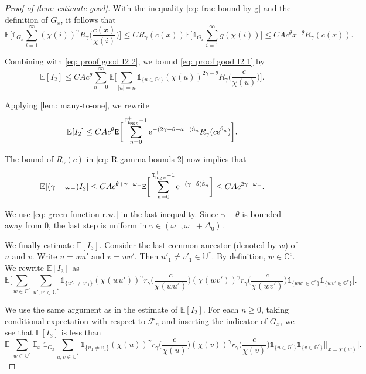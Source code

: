 \documentclass[10pt,a4paper]{amsart}
\begin{document}
\begin{proof}[Proof of \cref{lem: estimate good}]
\noindent With the inequality \eqref{eq: frac bound by g} and the definition of $G_x$, it follows that
\[\mathbb{E}\bigg[\mathds{1}_{G_x}\sum^{\infty}_{i=1} (\chi(i))^{\gamma}R_{\gamma}\Big(\frac{c(x)}{\chi(i)}\Big)\bigg]\leq CR_{\gamma}(c(x))\mathbb{E}\bigg[\mathds{1}_{G_x}\sum^{\infty}_{i=1} g(\chi(i))\bigg]\leq CAc^{\theta}x^{-\theta}R_{\gamma}(c(x)). \]

\noindent Combining with \eqref{eq: proof good I2 2}, we bound \eqref{eq: proof good I2 1} by
\[\mathbb{E}[I_2]\leq CAc^{\theta}\sum^{\infty}_{n=0}\mathbb{E}\bigg[\sum_{|u|=n}\mathds{1}_{\{u\in\mathbb{G}^c\}} (\chi(u))^{2\gamma-\theta}R_{\gamma}\Big(\frac{c}{\chi(u)}\Big)\bigg].\]

\noindent Applying \cref{lem: many-to-one}, we rewrite
\[
\mathbb{E}[I_2]\leq CAc^{\theta}{\tt E}\bigg[\sum^{{\tt T}^+_{\log c}-1}_{n=0}\mathrm{e}^{-(2\gamma-\theta-\omega_-){\hat{\tt S}}_n} R_{\gamma}(c\mathrm{e}^{{\hat{\tt S}}_n})\bigg].
\]

\noindent The bound of $R_{\gamma}(c)$ in \eqref{eq: R gamma bounds 2} now implies that
\begin{equation}\label{eq: proof good I2 final}
\mathbb{E}[(\gamma-\omega_-)I_2]\leq CAc^{\theta+\gamma-\omega_-} {\tt E}\bigg[\sum^{{\tt T}_{\log c}^+-1}_{n=0}\mathrm{e}^{-(\gamma-\theta){\hat{\tt S}}_n} \bigg]\leq CAc^{2\gamma-\omega_-}.
\end{equation}

\noindent We use \eqref{eq: green function r.w.} in the last inequality. Since $\gamma-\theta$ is bounded away from $0$, the last step is uniform in $\gamma\in(\omega_-, \omega_-+\Delta_0)$.

We finally estimate $\mathbb{E}[I_3]$. Consider the last common ancestor (denoted by $w$) of $u$ and $v$. Write $u = wu'$ and $v = wv'$. Then $u'_1\ne v'_1\in\mathbb{U}^*$. By definition, $w\in\mathbb{G}^c$. We rewrite $\mathbb{E}[I_3]$ as
\[
  \mathbb{E}\bigg[\sum_{w\in\mathbb{G}^c}\sum_{u', v'\in\mathbb{U}^*}\mathds{1}_{\{u'_1\ne v'_1\}}(\chi(wu'))^{\gamma}r_{\gamma}\Big(\frac{c}{\chi(wu')}\Big)(\chi(wv'))^{\gamma}r_{\gamma}\Big(\frac{c}{\chi(wv')}\Big)\mathds{1}_{\{wu'\in\mathbb{G}^c\}}\mathds{1}_{\{wv'\in\mathbb{G}^c\}}\bigg].
\]

\noindent We use the same argument as in the estimate of $\mathbb{E}[I_2]$. For each $n\geq 0$, taking conditional expectation with respect to $\mathcal{F}_n$ and inserting the indicator of $G_{x}$, we see that $\mathbb{E}[I_3]$ is less than
\begin{equation}\label{eq: proof good I3 1}
 \mathbb{E}\bigg[\sum_{w\in\mathbb{U}^c}\mathbb{E}_x\bigg[\mathds{1}_{G_x}\sum_{u, v\in\mathbb{U}^*}\mathds{1}_{\{u_1\ne v_1\}}(\chi(u))^{\gamma}r_{\gamma}\Big(\frac{c}{\chi(u)}\Big)(\chi(v))^{\gamma}r_{\gamma}\Big(\frac{c}{\chi(v)}\Big)\mathds{1}_{\{u\in\mathbb{G}^c\}}\mathds{1}_{\{v\in\mathbb{G}^c\}}\bigg]\bigg|_{x=\chi(w)}\bigg].
\end{equation}


\end{proof}
\end{document}
